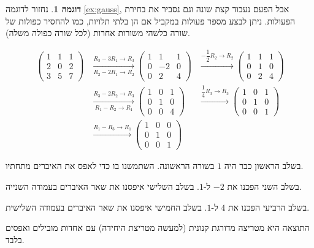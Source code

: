 \documentclass[12pt]{report}
\theoremstyle{plain}
\theoremstyle{definition}
\newtheorem{example}{דוגמה}[chapter]
\newcommand{\0}{\mathbf{0}}
\begin{document}
\begin{example}
נחזור לדוגמה 
\ref{ex:gauss},
אבל הפעם נעבוד קצת שונה וגם נסביר את בחירת הפעולות. ניתן לבצע מספר פעולות במקביל אם הן בלתי תלויות, כמו להחסיר כפולות של שורה כלשהי משורות אחרות (לכל שורה כפולה משלה). 

\begin{equation*}
	\begin{aligned}
		\begin{pmatrix}1 & 1 & 1 \\ 2 & 0 & 2 \\ 3 & 5 & 7 \end{pmatrix}
		&\xrightarrow[R_2-2R_1 \to R_2]{R_3-3R_1 \to R_3}
		\begin{pmatrix}1 & 1 & 1 \\ 0 & -2 & 0 \\ 0 & 2 & 4\end{pmatrix}
		&\xrightarrow{-\dfrac{1}{2}R_2 \to R_2}
		\begin{pmatrix}1 & 1 & 1 \\ 0 & 1 & 0 \\ 0 & 2 & 4 \end{pmatrix} \\
		&\xrightarrow[R_1-R_2 \to R_1]{R_3-2R_2 \to R_3}
		\begin{pmatrix}1 & 0 & 1 \\ 0 & 1 & 0 \\ 0 & 0 & 4\end{pmatrix}
		&\xrightarrow{\dfrac{1}{4}R_3 \to R_3}
		\begin{pmatrix}1 & 0 & 1 \\ 0 & 1 & 0 \\ 0 & 0 & 1\end{pmatrix} \\
		&\xrightarrow{R_1-R_3 \to R_1}
		\begin{pmatrix}1 & 0 & 0 \\ 0 & 1 & 0 \\ 0 & 0 & 1\end{pmatrix}
	\end{aligned}
\end{equation*}

בשלב הראשון כבר היה $1$ בשורה הראשונה. השתמשנו בו כדי לאפס את
האיברים מתחתיו. 

בשלב השני הפכנו את $-2$ ל-$1$. בשלב השלישי איפסנו את שאר
האיברים בעמודה השנייה.

בשלב הרביעי הפכנו את $4$ ל-$1$. בשלב החמישי איפסנו
את שאר האיברים בעמודה השלישית.

התוצאה היא מטריצה מדורגת קנונית (למעשה מטריצת היחידה) עם אחדות מובילים ואפסים בלבד.
\end{example}
\end{document}
